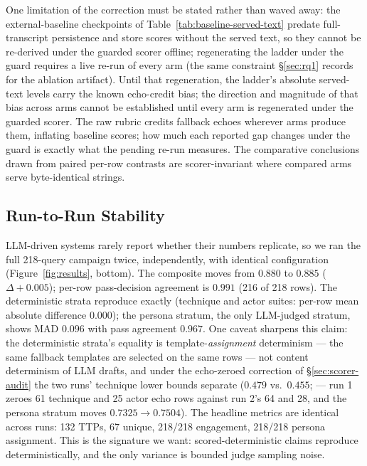 One limitation of the correction must be stated rather than waved
away: the external-baseline checkpoints of
Table~\ref{tab:baseline-served-text} predate full-transcript persistence
and store scores without the served text, so they cannot be re-derived
under the guarded scorer offline; regenerating the ladder under the
guard requires a live re-run of every arm (the same constraint
\S\ref{sec:rq1} records for the ablation artifact). Until that
regeneration, the ladder's absolute served-text levels carry the known
echo-credit bias; the direction and magnitude of that bias across arms
cannot be established until every arm is regenerated under the guarded
scorer. The raw rubric credits fallback echoes wherever arms produce
them, inflating baseline scores; how much each reported gap changes
under the guard is exactly what the pending re-run measures. The
comparative conclusions drawn from paired per-row contrasts are
scorer-invariant where compared arms serve byte-identical strings.

\subsection{Run-to-Run Stability}
\label{sec:stability}

LLM-driven systems rarely report whether their numbers replicate, so we
ran the full 218-query campaign twice, independently, with identical
configuration (Figure~\ref{fig:results}, bottom). The composite moves
from $0.880$ to $0.885$ ($\Delta
+0.005$); per-row pass-decision agreement is $0.991$ (216 of 218 rows).
The deterministic strata reproduce exactly (technique and actor suites:
per-row mean absolute difference $0.000$); the persona stratum, the only
LLM-judged stratum, shows MAD $0.096$ with pass agreement $0.967$. One
caveat sharpens this claim: the deterministic strata's equality is
template-\emph{assignment} determinism --- the same fallback templates are
selected on the same rows --- not content determinism of LLM drafts, and
under the echo-zeroed correction of \S\ref{sec:scorer-audit} the two
runs' technique lower bounds separate ($0.479$ vs.\ $0.455$;
 --- run 1 zeroes 61
technique and 25 actor echo rows against run 2's 64 and 28, and the
persona stratum moves $0.7325 \to 0.7504$). The
headline metrics are identical across runs: 132 TTPs, 67 unique,
218/218 engagement, 218/218 persona assignment. This is the signature we
want: scored-deterministic claims reproduce deterministically, and the
only variance is bounded judge sampling noise.

